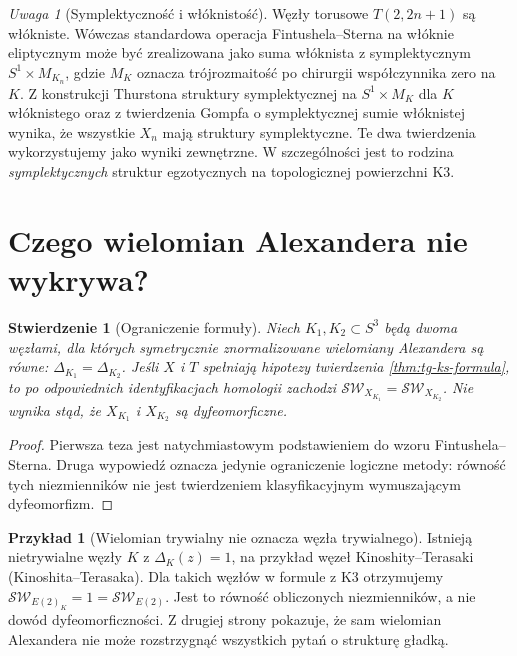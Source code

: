 \documentclass[11pt,a4paper]{report}
\numberwithin{equation}{section}
\theoremstyle{plain}
\newtheorem{stwierdzenie}[twierdzenie]{Stwierdzenie}
\theoremstyle{definition}
\newtheorem{przyklad}[twierdzenie]{Przykład}
\theoremstyle{remark}
\newtheorem{uwaga}[twierdzenie]{Uwaga}
\begin{document}
\begin{uwaga}[Symplektyczność i włóknistość]
Węzły torusowe $T(2,2n+1)$ są włókniste.
Wówczas standardowa operacja Fintushela--Sterna
na włóknie eliptycznym może być zrealizowana
jako suma włóknista z symplektycznym
$S^1\times M_{K_n}$, gdzie $M_K$ oznacza
trójrozmaitość po chirurgii współczynnika zero
na $K$. Z konstrukcji Thurstona struktury symplektycznej
na $S^1\times M_K$ dla $K$ włóknistego oraz
z twierdzenia Gompfa o symplektycznej sumie
włóknistej wynika, że wszystkie $X_n$ mają struktury
symplektyczne. Te dwa twierdzenia wykorzystujemy
jako wyniki zewnętrzne. W szczególności jest to
rodzina \emph{symplektycznych} struktur egzotycznych
na topologicznej powierzchni K3.
\end{uwaga}

\section{Czego wielomian Alexandera nie wykrywa?}
\label{sec:tg-ks-limits}

\begin{stwierdzenie}[Ograniczenie formuły]
\label{prop:tg-ks-limit}
Niech $K_1,K_2\subset S^3$ będą dwoma węzłami,
dla których symetrycznie znormalizowane wielomiany
Alexandera są równe:
$\Delta_{K_1}=\Delta_{K_2}$.
Jeśli $X$ i $T$ spełniają hipotezy twierdzenia
\ref{thm:tg-ks-formula}, to po odpowiednich
identyfikacjach homologii zachodzi
$\mathcal{SW}_{X_{K_1}}=\mathcal{SW}_{X_{K_2}}$.
Nie wynika stąd, że $X_{K_1}$ i $X_{K_2}$
są dyfeomorficzne.
\end{stwierdzenie}

\begin{proof}
Pierwsza teza jest natychmiastowym podstawieniem
do wzoru Fintushela--Sterna. Druga wypowiedź oznacza
jedynie ograniczenie logiczne metody: równość tych
niezmienników nie jest twierdzeniem klasyfikacyjnym
wymuszającym dyfeomorfizm.
\end{proof}

\begin{przyklad}[Wielomian trywialny nie oznacza węzła trywialnego]
Istnieją nietrywialne węzły $K$ z $\Delta_K(z)=1$,
na przykład węzeł Kinoshity--Terasaki (Kinoshita--Terasaka).
Dla takich węzłów w formule z K3 otrzymujemy
$\mathcal{SW}_{E(2)_K}=1=\mathcal{SW}_{E(2)}$.
Jest to równość obliczonych niezmienników, a nie
dowód dyfeomorficzności. Z drugiej strony pokazuje,
że sam wielomian Alexandera nie może rozstrzygnąć
wszystkich pytań o strukturę gładką.
\end{przyklad}
\end{document}
